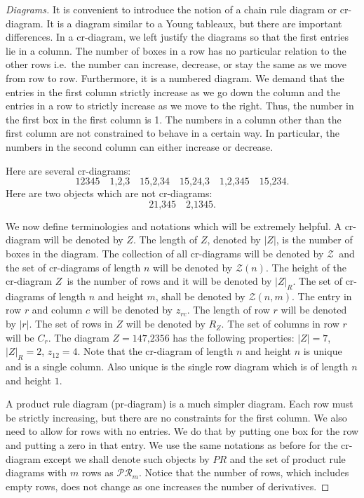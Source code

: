 \documentclass[11pt]{article}
\theoremstyle{remark}
\begin{document}
\begin{proof}[{Diagrams}] {
It is convenient to introduce the notion of a chain rule diagram or 
cr-diagram. It
is a diagram similar to a Young tableaux, but there are important
differences. In a cr-diagram, we left justify the diagrams so that the
first entries lie in a column. The number of boxes in a row has no
particular relation to the other rows i.e.\ the number can 
increase, decrease, or stay the same as we move from row to
row. Furthermore, it is a numbered diagram. We demand that the entries
in the first column strictly increase as we go down the column and the
entries in a row to 
strictly increase as we move to the right. Thus, the number in the
first box in the first column is 1.
The numbers in a column other than the first column
are not constrained to behave in a certain way. In particular, the
numbers in the second column can either increase or decrease. 

Here are several cr-diagrams: {\scriptsize \[ \boxed{\text{12345}} \quad
\boxed{\text{1,2,3}} \quad \boxed{\text{15,2,34}} \quad \boxed{\text{15,24,3}} \quad
\boxed{\text{1,2,345}} \quad \boxed{\text{15,234}}.\]} 
Here are two objects which are not cr-diagrams:
{\scriptsize\[  \boxed{\text{21,345}} \quad \boxed{\text{2,1345}} .\]}


We now define terminologies and notations which will be extremely 
helpful. A cr-diagram will be denoted by \ensuremath{Z}. The length of \ensuremath{Z},
denoted by $ |\ensuremath{Z}| $, is the number of boxes in the diagram.  
The collection of all cr-diagrams will be denoted by
\ensuremath{\mathcal{\ensuremath{Z}}}\ and the set of cr-diagrams of length $n$ will be denoted by
$\ensuremath{\mathcal{\ensuremath{Z}}}(n)$. The 
height of the cr-diagram \ensuremath{Z}\ is the number of rows and it will be
denoted by $ |\ensuremath{Z}|_{R} $. The set of cr-diagrams of length $n$ and height
$m$, shall be denoted by $\ensuremath{\mathcal{\ensuremath{Z}}}(n,m)$. 
The entry in row $r$ and column $c$ will be
denoted by $\ensuremath{z}_{rc}$. The length of  row $r$ will be denoted by
$ |r| $. The set of rows in $\ensuremath{Z}$ will be denoted by $R_{\ensuremath{Z}}$. The
set of columns in row  $r$ will be $C_{ r}$. The diagram 
{\scriptsize $ \ensuremath{Z}= {\boxed{\text{147,2356}}}$} 
has the
following properties: $ |\ensuremath{Z}| =7 $, $ |\ensuremath{Z}|_R = 2$, $ \ensuremath{z}_{12} = 4$.  
Note that the cr-diagram of length $n$ and height $n$ is unique and is
a single column. Also unique is the single row diagram which is of
length $n$ and height $1$.


A product rule diagram (pr-diagram) is a much simpler diagram. Each row must
be strictly increasing, but there are no constraints for the first
column. We also need to allow for rows with no entries. We do that by
putting one box for the row and putting a zero in that entry. We use
the same notations as before for the cr-diagram except we shall denote 
such objects by $PR$ and the set of product rule diagrams with $m$
rows as $\ensuremath{\mathcal{PR}}_m$. Notice that the number of rows, which includes
empty rows, does not change as one increases the number of derivatives.
}
 \end{proof}
\end{document}
